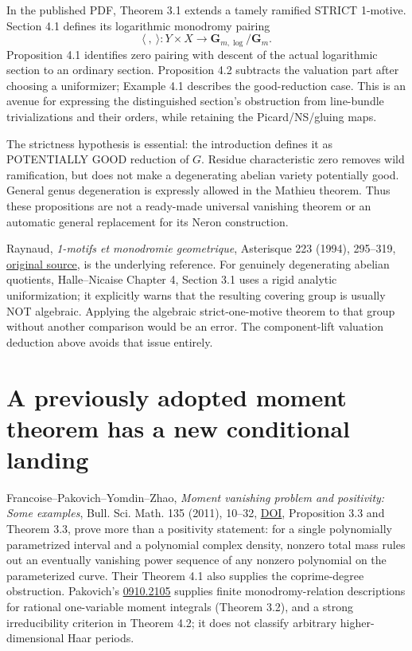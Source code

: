 \documentclass{article}
\begin{document}
In the published PDF, Theorem 3.1 extends a tamely ramified STRICT 1-motive. Section 4.1 defines its logarithmic monodromy pairing
\[
 \langle\ ,\ \rangle:Y\times X\longrightarrow
 \mathbf G_{m,\log}/\mathbf G_m.
\]
Proposition 4.1 identifies zero pairing with descent of the actual logarithmic section to an ordinary section. Proposition 4.2 subtracts the valuation part after choosing a uniformizer; Example 4.1 describes the good-reduction case. This is an avenue for expressing the distinguished section's obstruction from line-bundle trivializations and their orders, while retaining the Picard/NS/gluing maps.

The strictness hypothesis is essential: the introduction defines it as POTENTIALLY GOOD reduction of $G$. Residue characteristic zero removes wild ramification, but does not make a degenerating abelian variety potentially good. General genus degeneration is expressly allowed in the Mathieu theorem. Thus these propositions are not a ready-made universal vanishing theorem or an automatic general replacement for its Neron construction.

Raynaud, \emph{1-motifs et monodromie geometrique}, Asterisque 223 (1994), 295--319, \href{https://archive.numdam.org/item/AST_1994__223__295_0/}{original source}, is the underlying reference. For genuinely degenerating abelian quotients, Halle--Nicaise Chapter 4, Section 3.1 uses a rigid analytic uniformization; it explicitly warns that the resulting covering group is usually NOT algebraic. Applying the algebraic strict-one-motive theorem to that group without another comparison would be an error. The component-lift valuation deduction above avoids that issue entirely.

\section{A previously adopted moment theorem has a new conditional landing}
Francoise--Pakovich--Yomdin--Zhao, \emph{Moment vanishing problem and positivity: Some examples}, Bull. Sci. Math. 135 (2011), 10--32, \href{https://doi.org/10.1016/j.bulsci.2010.06.002}{DOI}, Proposition 3.3 and Theorem 3.3, prove more than a positivity statement: for a single polynomially parametrized interval and a polynomial complex density, nonzero total mass rules out an eventually vanishing power sequence of any nonzero polynomial on the parameterized curve. Their Theorem 4.1 also supplies the coprime-degree obstruction. Pakovich's \href{https://arxiv.org/abs/0910.2105}{0910.2105} supplies finite monodromy-relation descriptions for rational one-variable moment integrals (Theorem 3.2), and a strong irreducibility criterion in Theorem 4.2; it does not classify arbitrary higher-dimensional Haar periods.
\end{document}

